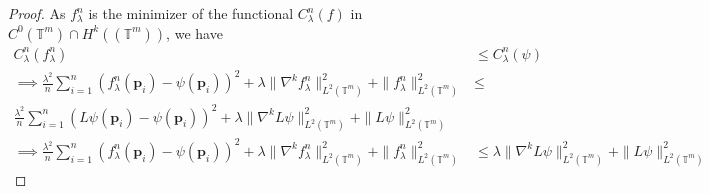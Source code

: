 \documentclass[multixcb]{amstext-l}
\theoremstyle{plain}
\theoremstyle{definition}
\theoremstyle{definition}
\theoremstyle{remark}
\numberwithin{equation}{chapter}
\begin{document}
\begin{proof}

As $f^n_{\lambda}$ is the minimizer of the functional $C^n_{\lambda}(f)$ in $C^0(\mathbb{T}^m)\cap H^k((\mathbb{T}^m))$, we have 
\begin{equation}\label{eqap2}
\begin{aligned}
C^n_{\lambda}(f^n_{\lambda}) &\le C^n_{\lambda}(\psi) \\
\implies  \frac{\lambda^2}{n}\sum\limits_{i=1}^{n}(f^n_{\lambda}(\boldsymbol{p}_i)-\psi(\boldsymbol{p}_i))^2 + \lambda\|\nabla^kf^n_{\lambda}\|_{L^2(\mathbb{T}^m)}^2 + \|f^n_{\lambda}\|_{L^2(\mathbb{T}^m)}^2 &\le \\ \frac{\lambda^2}{n}\sum\limits_{i=1}^{n}(L\psi(\boldsymbol{p}_i)-\psi(\boldsymbol{p}_i))^2 + \lambda\|\nabla^kL\psi\|_{L^2(\mathbb{T}^m)}^2 + \|L\psi\|_{L^2(\mathbb{T}^m)}^2
\\
\implies \frac{\lambda^2}{n}\sum\limits_{i=1}^{n}(f^n_{\lambda}(\boldsymbol{p}_i)-\psi(\boldsymbol{p}_i))^2 + \lambda\|\nabla^kf^n_{\lambda}\|_{L^2(\mathbb{T}^m)}^2 + \|f^n_{\lambda}\|_{L^2(\mathbb{T}^m)}^2  &\le \lambda\|\nabla^kL\psi\|_{L^2(\mathbb{T}^m)}^2 + \|L\psi\|_{L^2(\mathbb{T}^m)}^2
\end{aligned}
\end{equation}


\end{proof}
\end{document}
